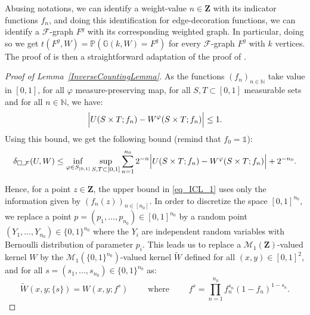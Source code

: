 \documentclass{amsart}
\theoremstyle{plain}
\theoremstyle{definition}
\newcommand{\Space}{\mathbf{Z}}
\newcommand{\bbG}{\mathbb{G}}
\newcommand{\Proba}{\mathcal{M}_1(\Space)}
\newcommand{\InvRelabel}{S_{[0,1]}}
\newcommand{\ddcutF}{\delta_{\square,\mathcal{F}}}
\newcommand{\F}{\mathcal{F}}
\newcommand{\Prb}{\mathbb{P}}
\newcommand{\un}{\mathds{1}}
\newcommand{\N}{\mathbb{N}}
\begin{document}
Abusing notations, we can identify a weight-value $n\in\Space$
	with its indicator functions $f_n$,
	and doing this identification for edge-decoration functions,
	we can identify a $\F$-graph $F^g$ 
		with its corresponding weighted graph.
In particular, doing so we get $t(F^g,W) = \Prb( \bbG(k,W) = F^g)$
	for every $\F$-graph $F^g$ with $k$ vertices.
The proof of  is
	then a straightforward adaptation of the proof of \cite[Lemma 10.31 and Lemma 10.32]{Lovasz}.



\begin{proof}[Proof of Lemma~\ref{InverseCountingLemma}]
As the functions $(f_n)_{n\in \N}$ take value in $[0,1]$, 
for all $\varphi$ measure-preserving map,
for all $S,T \subset [0,1]$ measurable sets
and for all $n\in \N$, we have:
\[ \Bigl\vert U(S\times T;f_n) - W^\varphi(S\times T;f_n) \Bigr\vert \leq 1 .\]
Using this bound, we get the following bound
(remind that $f_0 = \un$):
\begin{equation}\label{eq_ICL_1}
\ddcutF(U,W) \leq
\inf_{\varphi\in\InvRelabel} \sup_{S,T \subset [0,1]} \sum_{n=1}^{n_0} 2^{-n} 
			\Bigl\vert U(S\times T;f_n) - W^\varphi(S\times T;f_n) \Bigr\vert
+ 2^{-n_0}		.
\end{equation}

Hence, for a point $z\in\Space$, the upper bound in \eqref{eq_ICL_1}
uses only the information given by $(f_n(z))_{n\in [n_0]}$.
In order to discretize the space $[0,1]^{n_0}$, we replace 
a point $p = (p_1,\dots, p_{n_0}) \in [0,1]^{n_0}$
by a random point $(Y_1,\dots,Y_{n_0}) \in \{0,1\}^{n_0}$
where the $Y_i$ are independent random variables
with Bernoulli distribution of parameter $p_i$.
This leads us to replace a $\Proba$-valued kernel $W$
by the $\mathcal{M}_1(\{0,1\}^{n_0})$-valued kernel $\tilde{W}$
defined for all $(x,y) \in [0,1]^2$, and for all $s =(s_1, \dots, s_{n_0})\in  \{0,1\}^{n_0}$ as:
\begin{equation*}
\tilde{W}(x,y;\{s\}) = W(x,y; f^s) 
\qquad\text{ where }\qquad
f^s = \prod_{n=1}^{n_0} f_n^{s_n} (1- f_n)^{1-s_n} . 
\end{equation*}


\end{proof}
\end{document}
